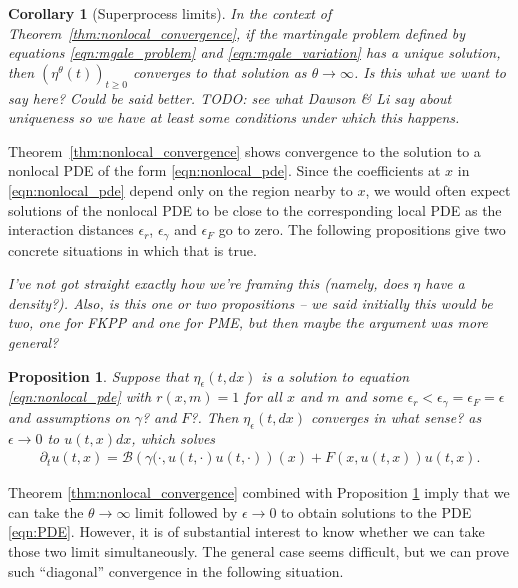 \documentclass[12pt]{article}
\newtheorem{proposition}[theorem]{Proposition}
\newtheorem{corollary}[theorem]{Corollary}
\newcommand{\DG}{\mathcal{B}}  %
\newcommand{\comment}[1]{{\color{blue} \it #1}}
\begin{document}
\begin{corollary}[Superprocess limits] \label{cor:superprocess_uniqueness}
    In the context of Theorem~\ref{thm:nonlocal_convergence},
    if the martingale problem
    defined by equations \eqref{eqn:mgale_problem} and \eqref{eqn:mgale_variation}
    has a unique solution,
    then $(\eta^\theta(t))_{t \ge 0}$ converges to that solution
    as $\theta \to \infty$.
    \comment{
        Is this what we want to say here? Could be said better.
        TODO: see what Dawson \& Li say about uniqueness
        so we have at least some conditions under which this happens.
    }
\end{corollary}

Theorem~\ref{thm:nonlocal_convergence} shows convergence to the solution to a nonlocal PDE
of the form \eqref{eqn:nonlocal_pde}.
Since the coefficients at $x$ in \eqref{eqn:nonlocal_pde}
depend only on the region nearby to $x$,
we would often expect solutions of the nonlocal PDE to be close to the corresponding local PDE
as the interaction distances $\epsilon_r$, $\epsilon_\gamma$ and $\epsilon_F$
go to zero.
The following propositions give two concrete situations in which that is true.

\comment{I've not got straight exactly how we're framing this
    (namely, does $\eta$ have a density?).
    Also, is this one or two propositions --
    we said initially this would be two,
    one for FKPP and one for PME,
    but then maybe the argument was more general?
}

\begin{proposition}
    \label{prop:nonlocal_to_local}
    Suppose that $\eta_\epsilon(t,dx)$ is a solution to equation \eqref{eqn:nonlocal_pde}
    with $r(x, m) = 1$ for all $x$ and $m$
    and some $\epsilon_r < \epsilon_\gamma = \epsilon_F = \epsilon$
    \comment{and assumptions on $\gamma$? and $F$?}.
    Then $\eta_\epsilon(t, dx)$ converges \comment{in what sense?} as $\epsilon \to 0$
    to $u(t, x) dx$, which solves
    \begin{align} \label{eqn:PDE}
        \partial_t u(t, x)
        =
        \DG \left( \gamma(\cdot, u(t, \cdot) u(t, \cdot)  \right)(x)
        + F(x, u(t, x)) u(t, x) .
    \end{align}
\end{proposition}

Theorem \ref{thm:nonlocal_convergence} combined with Proposition \ref{prop:nonlocal_to_local}
imply that we can take the $\theta \to \infty$ limit
followed by $\epsilon \to 0$
to obtain solutions to the PDE \eqref{eqn:PDE}.
However, it is of substantial interest to know whether
we can take those two limit simultaneously.
The general case seems difficult,
but we can prove such ``diagonal'' convergence in the following situation.
\end{document}
